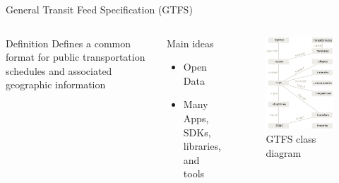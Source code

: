 \documentclass[xcolor=dvipsnames,table]{beamer}
\begin{document}
\begin{frame}{General Transit Feed Specification (GTFS)}
        \begin{columns}
                \begin{block}{Definition}
                        Defines a common format for
                        public transportation schedules and associated geographic information
                \end{block}
                \begin{block}{Main ideas}
                        \begin{itemize}
                                \item Open Data
                                \item Many Apps, SDKs, libraries, and tools 
                        \end{itemize}
                \end{block}
                \centering
                \begin{figure}[H]
                        \centering
                        \includegraphics[scale=0.35]{images/GTFS_class_diagram.png}
                        \caption{GTFS class diagram}
                \end{figure}
        \end{columns}
\end{frame}
\end{document}
